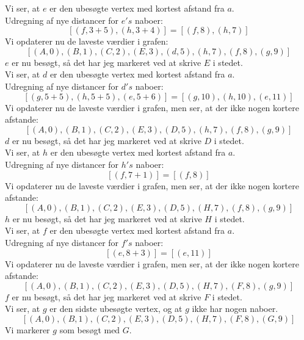 \documentclass[a4paper,12pt]{article}
\begin{document}
Vi ser, at $e$ er den ubesøgte vertex med kortest afstand fra $a$.\\
Udregning af nye distancer for $e's$ naboer:
\[
[(f,3+5),(h,3+4)] = [(f,8),(h,7)]
\]
Vi opdaterer nu de laveste værdier i grafen:
\[
[(A,0),(B,1),(C,2),(E,3),(d,5),(h,7),(f,8),(g,9)]
\]
$e$ er nu besøgt, så det har jeg markeret ved at skrive $E$ i stedet.\\

Vi ser, at $d$ er den ubesøgte vertex med kortest afstand fra $a$.\\
Udregning af nye distancer for $d's$ naboer:
\[
[(g,5+5),(h,5+5),(e,5+6)] = [(g,10),(h,10),(e,11)]
\]
Vi opdaterer nu de laveste værdier i grafen, men ser, at der ikke nogen kortere afstande:
\[
[(A,0),(B,1),(C,2),(E,3),(D,5),(h,7),(f,8),(g,9)]
\]
$d$ er nu besøgt, så det har jeg markeret ved at skrive $D$ i stedet.\\

Vi ser, at $h$ er den ubesøgte vertex med kortest afstand fra $a$.\\
Udregning af nye distancer for $h's$ naboer:
\[
[(f,7+1)] = [(f,8)]
\]
Vi opdaterer nu de laveste værdier i grafen, men ser, at der ikke nogen kortere afstande:
\[
[(A,0),(B,1),(C,2),(E,3),(D,5),(H,7),(f,8),(g,9)]
\]
$h$ er nu besøgt, så det har jeg markeret ved at skrive $H$ i stedet.\\

Vi ser, at $f$ er den ubesøgte vertex med kortest afstand fra $a$.\\
Udregning af nye distancer for $f's$ naboer:
\[
[(e,8+3)] = [(e,11)]
\]
Vi opdaterer nu de laveste værdier i grafen, men ser, at der ikke nogen kortere afstande:
\[
[(A,0),(B,1),(C,2),(E,3),(D,5),(H,7),(F,8),(g,9)]
\]
$f$ er nu besøgt, så det har jeg markeret ved at skrive $F$ i stedet.\\

Vi ser, at $g$ er den sidste ubesøgte vertex, og at $g$ ikke har nogen naboer.\\
\[
[(A,0),(B,1),(C,2),(E,3),(D,5),(H,7),(F,8),(G,9)]
\]
Vi markerer $g$ som besøgt med $G$.

\subsection[]{}



\subsection[]{}



\subsection[]{}
\end{document}

